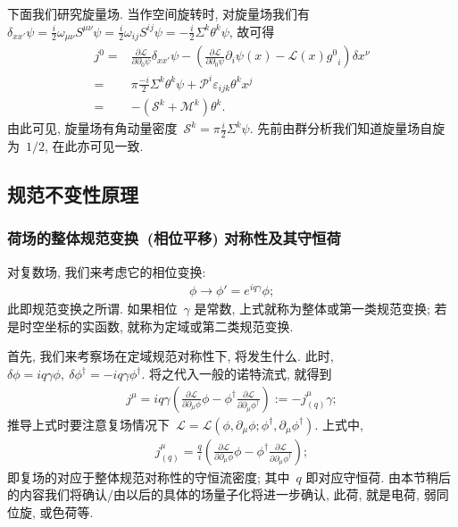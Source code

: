 下面我们研究旋量场. 当作空间旋转时, 对旋量场我们有~$\delta_{xx'}\psi=\frac{i}{2}\omega_{\mu\nu}S^{\mu\nu}\psi=\frac{i}{2}\omega_{ij}S^{ij}\psi=-\frac{i}{2}\Sigma^k\theta^k\psi$, 故可得
\begin{align}
j^0=&\frac{\partial\mathcal{L}}{\partial\partial_0\psi}\delta_{xx'}\psi-\left(\frac{\partial\mathcal{L}}{\partial\partial_0\psi}\partial_i\psi(x)-\mathcal{L}(x){g^0}_i\right)\delta x^\nu\nonumber\\
=&\pi\frac{-i}{2}\Sigma^k\theta^k\psi+\mathcal{P}^i\varepsilon_{ijk}\theta^k x^j\nonumber\\
=&-(\mathcal{S}^k+\mathcal{M}^k)\theta^k.
\end{align}
由此可见, 旋量场有角动量密度~$\mathcal{S}^k=\pi\frac{i}{2}\Sigma^k\psi$. 先前由群分析我们知道旋量场自旋为~$1/2$, 在此亦可见一致.



\subsection{规范不变性原理}
\subsubsection{荷场的整体规范变换~(相位平移) 对称性及其守恒荷}


对复数场, 我们来考虑它的相位变换:
\begin{align}\label{U1}
\phi\rightarrow\phi'=e^{iq\gamma}\phi;
\end{align}
此即规范变换之所谓. 如果相位~$\gamma$ 是常数, 上式就称为整体或第一类规范变换; 若是时空坐标的实函数, 就称为定域或第二类规范变换.

首先, 我们来考察场在定域规范对称性下, 将发生什么. 此时, $\delta\phi=iq\gamma\phi,~\delta\phi^\dag=-iq\gamma\phi^\dag$. 将之代入一般的诺特流式, 就得到
\begin{align}
j^\mu=iq\gamma\left(\frac{\partial\mathcal{L}}{\partial\partial_\mu\phi}\phi-\phi^\dag\frac{\partial\mathcal{L}}{\partial\partial_\mu\phi^\dag}\right):=-j^\mu_{(q)}\gamma;
\end{align}
推导上式时要注意复场情况下~$\mathcal{L}=\mathcal{L}(\phi,\partial_\mu\phi;\phi^\dag,\partial_\mu\phi^\dag)$. 上式中,
\begin{align}
j^\mu_{(q)}=\frac{q}{i}\left(\frac{\partial\mathcal{L}}{\partial\partial_\mu\phi}\phi-\phi^\dag\frac{\partial\mathcal{L}}{\partial\partial_\mu\phi^\dag}\right);
\end{align}
即复场的对应于整体规范对称性的守恒流密度; 其中~$q$ 即对应守恒荷. 由本节稍后的内容我们将确认/由以后的具体的场量子化将进一步确认, 此荷, 就是电荷, 弱同位旋, 或色荷等.

